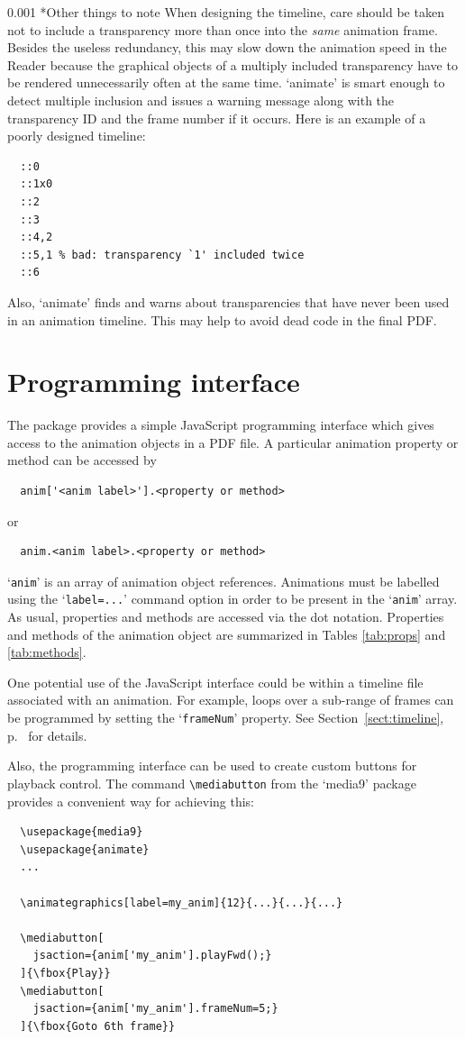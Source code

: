 \documentclass[a4paper]{article}
\makeatletter
\newcommand\myparagraph{\@startsection{paragraph}{3}{\z@}%
                                     {\parskip}%
                                     {0.001\parskip}%
                                     {\itshape\normalsize}}
\makeatother
\begin{document}
\myparagraph*{Other things to note}
When designing the timeline, care should be taken not to include a transparency more than once into the \emph{same} animation frame. Besides the useless redundancy, this may slow down the animation speed in the Reader because the graphical objects of a multiply included transparency have to be rendered unnecessarily often at the same time. `animate' is smart enough to detect multiple inclusion and issues a warning message along with the transparency ID and the frame number if it occurs. Here is an example of a poorly designed timeline:
\small
\begin{verbatim}
  ::0
  ::1x0
  ::2
  ::3
  ::4,2
  ::5,1 % bad: transparency `1' included twice
  ::6
\end{verbatim}
\normalsize
Also, `animate' finds and warns about transparencies that have never been used in an animation timeline. This may help to avoid dead code in the final PDF.

\section{Programming interface}\label{sect:api}
The package provides a simple JavaScript programming interface which gives access to the animation objects in a PDF file. A particular animation property or method can be accessed by
\begin{verbatim}
  anim['<anim label>'].<property or method>
\end{verbatim} 
or
\begin{verbatim}
  anim.<anim label>.<property or method>
\end{verbatim}
`\verb+anim+' is an array of animation object references. Animations must be labelled using the `\verb+label=...+' command option in order to be present in the `\verb+anim+' array. As usual, properties and methods are accessed via the dot notation. Properties and methods of the animation object are summarized in Tables \ref{tab:props} and \ref{tab:methods}.

One potential use of the JavaScript interface could be within a timeline file associated with an animation. For example, loops over a sub-range of frames can be programmed by setting the `\verb+frameNum+' property. See Section~\ref{sect:timeline}, p.~\pageref{sect:jsfield} for details.

Also, the programming interface can be used to create custom buttons for playback control. The command \verb+\mediabutton+ from the `media9' package provides a convenient way for achieving this:
\begin{verbatim}
  \usepackage{media9}
  \usepackage{animate}
  ...

  \animategraphics[label=my_anim]{12}{...}{...}{...}

  \mediabutton[
    jsaction={anim['my_anim'].playFwd();}
  ]{\fbox{Play}}
  \mediabutton[
    jsaction={anim['my_anim'].frameNum=5;}
  ]{\fbox{Goto 6th frame}}
\end{verbatim}
\end{document}

